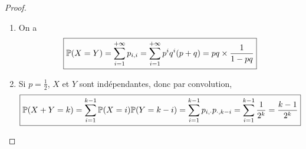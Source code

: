 \begin{proof}
\begin{enumerate}
        \item On a 
        \begin{equation}
            \boxed{\P(X=Y)=\sum_{i=1}^{+\infty}p_{i,i}=\sum_{i=1}^{+\infty}p^{i}q^{i}(p+q)=pq\times\frac{1}{1-pq}}
        \end{equation}

        \item Si $p=\frac{1}{2}$, $X$ et $Y$ sont indépendantes, donc par convolution,
        \begin{equation}
            \boxed{\P(X+Y=k)=\sum_{i=1}^{k-1}\P(X=i)\P(Y=k-i)=\sum_{i=1}^{k-1}p_{i,\cdot}p_{\cdot,k-i}=\sum_{i=1}^{k-1}\frac{1}{2^{k}}=\frac{k-1}{2^{k}}}
        \end{equation}
    \end{enumerate}
\end{proof}

